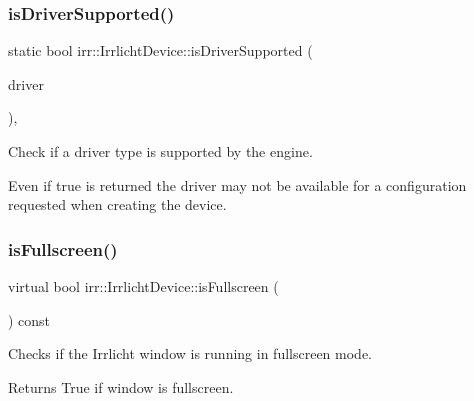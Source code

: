 \subsubsection{\texorpdfstring{is\+Driver\+Supported()}{isDriverSupported()}\hspace{0.1cm}{\footnotesize\ttfamily [3/3]}}
{\footnotesize\ttfamily static bool irr\+::\+Irrlicht\+Device\+::is\+Driver\+Supported (\begin{DoxyParamCaption}\item[{\hyperlink{namespaceirr_1_1video_ae35a6de6d436c76107ad157fe42356d0}{video\+::\+E\+\_\+\+D\+R\+I\+V\+E\+R\+\_\+\+T\+Y\+PE}}]{driver }\end{DoxyParamCaption})\hspace{0.3cm}{\ttfamily [inline]}, {\ttfamily [static]}}



Check if a driver type is supported by the engine. 

Even if true is returned the driver may not be available for a configuration requested when creating the device. \mbox{\label{classirr_1_1IrrlichtDevice_a409df5e9b9b90635bd3c2db31978a5c1}} 
\subsubsection{\texorpdfstring{is\+Fullscreen()}{isFullscreen()}\hspace{0.1cm}{\footnotesize\ttfamily [1/3]}}
{\footnotesize\ttfamily virtual bool irr\+::\+Irrlicht\+Device\+::is\+Fullscreen (\begin{DoxyParamCaption}{ }\end{DoxyParamCaption}) const\hspace{0.3cm}{\ttfamily [pure virtual]}}



Checks if the Irrlicht window is running in fullscreen mode. 

\begin{DoxyReturn}{Returns}
True if window is fullscreen. 
\end{DoxyReturn}
\mbox{\label{classirr_1_1IrrlichtDevice_a409df5e9b9b90635bd3c2db31978a5c1}} 
